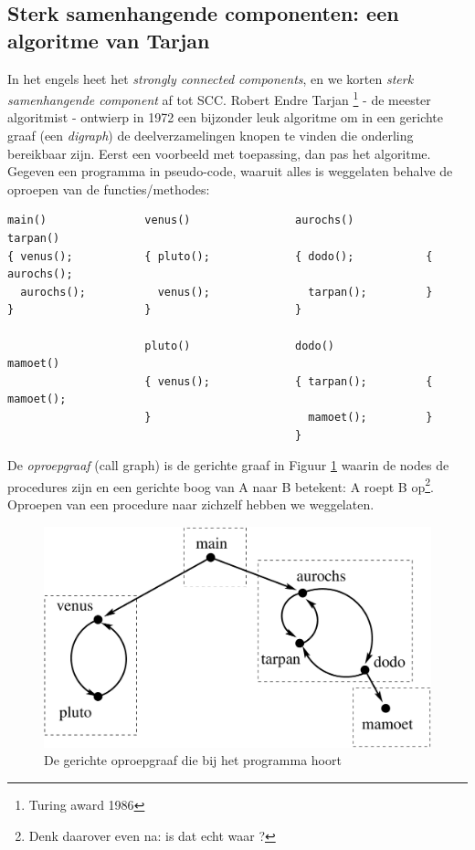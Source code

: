 \subsection{Sterk samenhangende componenten: een algoritme van Tarjan}\label{sccs}

In het engels heet het {\em strongly connected components}, en we
korten {\em sterk samenhangende component} af tot SCC. Robert Endre
Tarjan \footnote{Turing award 1986} - de meester algoritmist -
ontwierp in 1972 een bijzonder leuk algoritme om in een gerichte graaf
(een {\em digraph}) de deelverzamelingen knopen te vinden die
onderling bereikbaar zijn. Eerst een voorbeeld met toepassing, dan pas
het algoritme. Gegeven een programma in pseudo-code, waaruit alles is
weggelaten behalve de oproepen van de functies/methodes:
\begin{Verbatim}[frame=single, samepage=true, fontsize=\scriptsize]
main()               venus()                aurochs()           tarpan()
{ venus();           { pluto();             { dodo();           { aurochs();
  aurochs();           venus();               tarpan();         }
}                    }                      }                    
                                                                          
                     pluto()                dodo()              mamoet()
                     { venus();             { tarpan();         { mamoet();
                     }                        mamoet();         }
                                            }
\end{Verbatim}
De {\em oproepgraaf} (call graph) is de gerichte graaf in Figuur
\ref{vbtarjan} waarin de nodes de procedures zijn en een gerichte boog
van A naar B betekent: A roept B op\footnote{Denk daarover even na: is
dat echt waar ?}. Oproepen van een procedure naar zichzelf hebben we
weggelaten.


\begin{figure}[h]
\begin{center}
\includegraphics[height=0.2\textheight,keepaspectratio]{vbtarjan}
\caption{De gerichte oproepgraaf die bij het programma hoort}\label{vbtarjan}
\end{center}
\end{figure}


